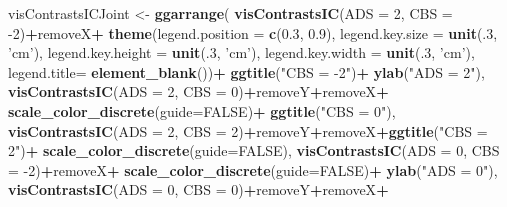 \documentclass[10pt,dvipsnames,enabledeprecatedfontcommands]{scrartcl}
\newenvironment{Shaded}{\begin{snugshade}}{\end{snugshade}}
\newcommand{\KeywordTok}[1]{\textcolor[rgb]{0.13,0.29,0.53}{\textbf{#1}}}
\newcommand{\DataTypeTok}[1]{\textcolor[rgb]{0.13,0.29,0.53}{#1}}
\newcommand{\DecValTok}[1]{\textcolor[rgb]{0.00,0.00,0.81}{#1}}
\newcommand{\FloatTok}[1]{\textcolor[rgb]{0.00,0.00,0.81}{#1}}
\newcommand{\StringTok}[1]{\textcolor[rgb]{0.31,0.60,0.02}{#1}}
\newcommand{\OtherTok}[1]{\textcolor[rgb]{0.56,0.35,0.01}{#1}}
\newcommand{\OperatorTok}[1]{\textcolor[rgb]{0.81,0.36,0.00}{\textbf{#1}}}
\newcommand{\NormalTok}[1]{#1}
\begin{document}
\begin{Shaded}
\begin{Highlighting}[]
\NormalTok{visContrastsICJoint <-}\StringTok{ }\KeywordTok{ggarrange}\NormalTok{(}
\KeywordTok{visContrastsIC}\NormalTok{(}\DataTypeTok{ADS =} \DecValTok{2}\NormalTok{, }\DataTypeTok{CBS =} \DecValTok{-2}\NormalTok{)}\OperatorTok{+}\NormalTok{removeX}\OperatorTok{+}\StringTok{ }
\StringTok{               }\KeywordTok{theme}\NormalTok{(}\DataTypeTok{legend.position =} \KeywordTok{c}\NormalTok{(}\FloatTok{0.3}\NormalTok{, }\FloatTok{0.9}\NormalTok{),}
                     \DataTypeTok{legend.key.size =} \KeywordTok{unit}\NormalTok{(.}\DecValTok{3}\NormalTok{, }\StringTok{'cm'}\NormalTok{),}
                     \DataTypeTok{legend.key.height =} \KeywordTok{unit}\NormalTok{(.}\DecValTok{3}\NormalTok{, }\StringTok{'cm'}\NormalTok{),}
                     \DataTypeTok{legend.key.width =} \KeywordTok{unit}\NormalTok{(.}\DecValTok{3}\NormalTok{, }\StringTok{'cm'}\NormalTok{),}
                     \DataTypeTok{legend.title=} \KeywordTok{element_blank}\NormalTok{())}\OperatorTok{+}
\StringTok{  }\KeywordTok{ggtitle}\NormalTok{(}\StringTok{"CBS = -2"}\NormalTok{)}\OperatorTok{+}
\StringTok{  }\KeywordTok{ylab}\NormalTok{(}\StringTok{"ADS = 2"}\NormalTok{),}
    \KeywordTok{visContrastsIC}\NormalTok{(}\DataTypeTok{ADS =} \DecValTok{2}\NormalTok{, }\DataTypeTok{CBS =} \DecValTok{0}\NormalTok{)}\OperatorTok{+}\NormalTok{removeY}\OperatorTok{+}\NormalTok{removeX}\OperatorTok{+}\StringTok{ }\KeywordTok{scale_color_discrete}\NormalTok{(}\DataTypeTok{guide=}\OtherTok{FALSE}\NormalTok{)}\OperatorTok{+}
\StringTok{  }\KeywordTok{ggtitle}\NormalTok{(}\StringTok{"CBS = 0"}\NormalTok{),}
    \KeywordTok{visContrastsIC}\NormalTok{(}\DataTypeTok{ADS =} \DecValTok{2}\NormalTok{, }\DataTypeTok{CBS =} \DecValTok{2}\NormalTok{)}\OperatorTok{+}\NormalTok{removeY}\OperatorTok{+}\NormalTok{removeX}\OperatorTok{+}\KeywordTok{ggtitle}\NormalTok{(}\StringTok{"CBS = 2"}\NormalTok{)}\OperatorTok{+}\StringTok{ }\KeywordTok{scale_color_discrete}\NormalTok{(}\DataTypeTok{guide=}\OtherTok{FALSE}\NormalTok{),}
\KeywordTok{visContrastsIC}\NormalTok{(}\DataTypeTok{ADS =} \DecValTok{0}\NormalTok{, }\DataTypeTok{CBS =} \DecValTok{-2}\NormalTok{)}\OperatorTok{+}\NormalTok{removeX}\OperatorTok{+}\StringTok{ }\KeywordTok{scale_color_discrete}\NormalTok{(}\DataTypeTok{guide=}\OtherTok{FALSE}\NormalTok{)}\OperatorTok{+}
\StringTok{  }\KeywordTok{ylab}\NormalTok{(}\StringTok{"ADS = 0"}\NormalTok{),}
    \KeywordTok{visContrastsIC}\NormalTok{(}\DataTypeTok{ADS =} \DecValTok{0}\NormalTok{, }\DataTypeTok{CBS =} \DecValTok{0}\NormalTok{)}\OperatorTok{+}\NormalTok{removeY}\OperatorTok{+}\NormalTok{removeX}\OperatorTok{+}\StringTok{ }

\end{Highlighting}
\end{Shaded}
\end{document}
